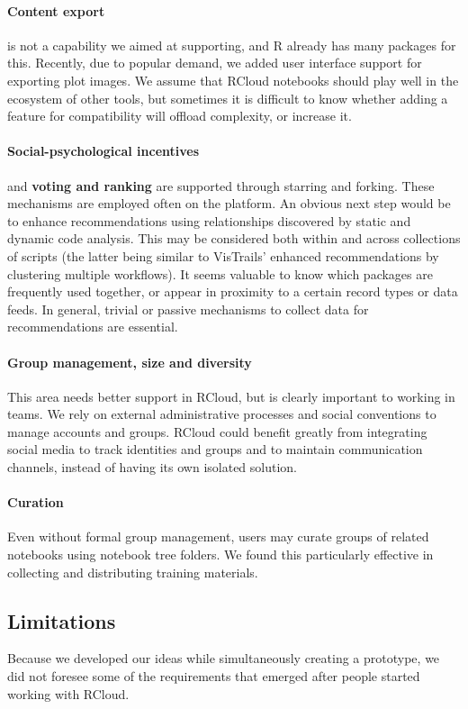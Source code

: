 \paragraph*{Content export} is not a capability we aimed at supporting,
and R already has many packages for this. Recently, due to popular
demand, we added user interface support for exporting plot images.
We assume that RCloud notebooks should play well in the ecosystem
of other tools, but sometimes it is difficult to know whether adding
a feature for compatibility will offload complexity, or increase it.

\paragraph*{Social-psychological incentives} and {\bf voting and ranking} are
supported through starring and forking. These mechanisms are employed often
on the platform. An obvious next step would be to enhance recommendations
using relationships discovered by static and dynamic code analysis. This
may be considered both within and across collections of scripts (the latter
being similar to VisTrails' enhanced recommendations by clustering multiple
workflows).  It seems valuable to know which packages are frequently used
together, or appear in proximity to a certain record types or data feeds.
In general, trivial or passive mechanisms to collect data for
recommendations are essential.

\paragraph*{Group management, size and diversity} This area needs better
support in RCloud, but is clearly important to working in teams.
We rely on external administrative processes and social conventions
to manage accounts and groups. RCloud could benefit greatly from
integrating social media to track identities and groups and to maintain
communication channels, instead of having its own isolated solution.

\paragraph*{Curation} Even without formal group management, users may
curate groups of related notebooks using notebook tree folders.
We found this particularly effective in collecting and distributing
training materials.

\subsection{Limitations}
Because we developed our ideas while simultaneously creating a prototype,
we did not foresee some of the requirements that emerged after
people started working with RCloud.

